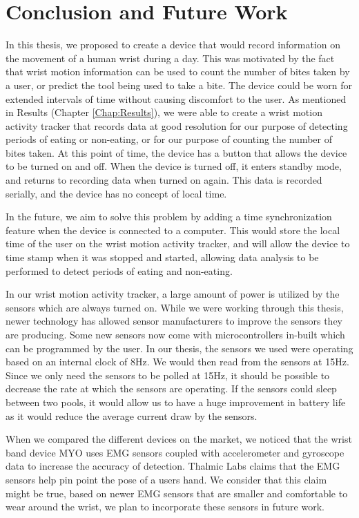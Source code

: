 \chapter{Conclusion and Future Work}
\label{Chap:Concl}
In this thesis, we proposed to create a device that would record information on 
the movement of a human wrist during a day.
This was motivated by the fact that wrist motion information can be used to count the number of bites
taken by a user,
or predict the tool being used to take a bite.
The device could be worn for extended intervals of time
without causing discomfort to the user.
As mentioned in Results (Chapter \ref{Chap:Results}),
we were able to create a wrist motion activity tracker that records data at good resolution
for our purpose of detecting periods of eating or non-eating, 
or for our purpose of counting the number of bites taken.
At this point of time,
the device has a button that allows the device to be turned on and off.
When the device is turned off,
it enters standby mode,
and returns to recording data when turned on again.
This data is recorded serially,
and the device has no concept of local time.

In the future,
we aim to solve this problem by adding a time synchronization feature when the device is connected to a computer.
This would store the local time of the user on the wrist motion activity tracker,
and will allow the device to time stamp when it was stopped and started,
allowing data analysis to be performed to detect periods of eating and non-eating.

In our wrist motion activity tracker,
a large amount of power is utilized by the sensors which are always turned on.
While we were working through this thesis,
newer technology has allowed sensor manufacturers to improve the sensors they are producing.
Some new sensors now come with microcontrollers in-built which can be programmed by the user.
In our thesis,
the sensors we used
were operating based on an internal clock of 8Hz.
We would then read from the sensors at 15Hz.
Since we only need the sensors to be polled at 15Hz,
it should be possible to decrease the rate at which the sensors are operating.
If the sensors could sleep between two pools,
it would allow us to have a huge improvement in battery life as it would reduce the average current draw by the sensors.

When we compared the different devices on the market,
we noticed that the wrist band device MYO uses EMG sensors coupled with accelerometer and gyroscope data to increase the accuracy of detection.
Thalmic Labs \cite{Web:GetMyo} claims that the EMG sensors help pin point the pose of a users hand.
We consider that this claim might be true,
based on newer EMG sensors that are smaller and comfortable to wear around the wrist,
we plan to incorporate these sensors in future work.